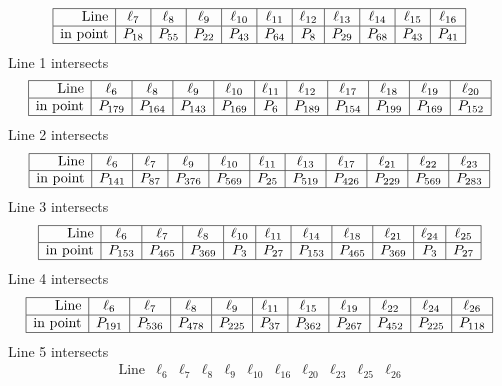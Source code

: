 \documentclass{article}
\begin{document}
{$$\begin{array}{|r*{10}{|c}|}
\hline
\mbox{Line}  & \ell_{7} & \ell_{8} & \ell_{9} & \ell_{10} & \ell_{11} & \ell_{12} & \ell_{13} & \ell_{14} & \ell_{15} & \ell_{16}\\
\hline
\mbox{in point}  & P_{18} & P_{55} & P_{22} & P_{43} & P_{64} & P_{8} & P_{29} & P_{68} & P_{43} & P_{41}\\
\hline
\end{array}
$$
Line 1 intersects 
$$
\begin{array}{|r*{10}{|c}|}
\hline
\mbox{Line}  & \ell_{6} & \ell_{8} & \ell_{9} & \ell_{10} & \ell_{11} & \ell_{12} & \ell_{17} & \ell_{18} & \ell_{19} & \ell_{20}\\
\hline
\mbox{in point}  & P_{179} & P_{164} & P_{143} & P_{169} & P_{6} & P_{189} & P_{154} & P_{199} & P_{169} & P_{152}\\
\hline
\end{array}
$$
Line 2 intersects 
$$
\begin{array}{|r*{10}{|c}|}
\hline
\mbox{Line}  & \ell_{6} & \ell_{7} & \ell_{9} & \ell_{10} & \ell_{11} & \ell_{13} & \ell_{17} & \ell_{21} & \ell_{22} & \ell_{23}\\
\hline
\mbox{in point}  & P_{141} & P_{87} & P_{376} & P_{569} & P_{25} & P_{519} & P_{426} & P_{229} & P_{569} & P_{283}\\
\hline
\end{array}
$$
Line 3 intersects 
$$
\begin{array}{|r*{10}{|c}|}
\hline
\mbox{Line}  & \ell_{6} & \ell_{7} & \ell_{8} & \ell_{10} & \ell_{11} & \ell_{14} & \ell_{18} & \ell_{21} & \ell_{24} & \ell_{25}\\
\hline
\mbox{in point}  & P_{153} & P_{465} & P_{369} & P_{3} & P_{27} & P_{153} & P_{465} & P_{369} & P_{3} & P_{27}\\
\hline
\end{array}
$$
Line 4 intersects 
$$
\begin{array}{|r*{10}{|c}|}
\hline
\mbox{Line}  & \ell_{6} & \ell_{7} & \ell_{8} & \ell_{9} & \ell_{11} & \ell_{15} & \ell_{19} & \ell_{22} & \ell_{24} & \ell_{26}\\
\hline
\mbox{in point}  & P_{191} & P_{536} & P_{478} & P_{225} & P_{37} & P_{362} & P_{267} & P_{452} & P_{225} & P_{118}\\
\hline
\end{array}
$$
Line 5 intersects 
$$
\begin{array}{|r*{10}{|c}|}
\hline
\mbox{Line}  & \ell_{6} & \ell_{7} & \ell_{8} & \ell_{9} & \ell_{10} & \ell_{16} & \ell_{20} & \ell_{23} & \ell_{25} & \ell_{26}\\

\end{array}$$}
\end{document}
